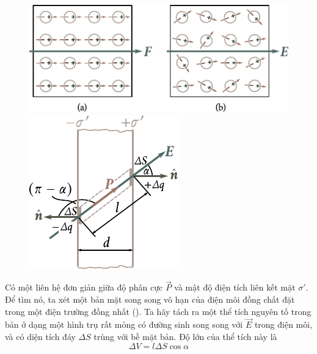 \begin{figure}[!htb]
	\begin{minipage}[t]{0.64\linewidth}
		\begin{center}
			\includegraphics[scale=1]{figures/ch_02/fig_2_1.pdf}
			\caption[]{}
			\label{fig:2_1}
		\end{center}
	\end{minipage}
	\hfill{}%
	\begin{minipage}[t]{0.34\linewidth}
		\begin{center}
			\includegraphics[scale=1]{figures/ch_02/fig_2_2.pdf}
			\caption[]{}
			\label{fig:2_2}
		\end{center}
	\end{minipage}
\vspace{-0.4cm}
\end{figure}

Có một liên hệ đơn giản giữa độ phân cực $\vec{P}$ và mật độ điện tích liên kết mặt $\sigma'$. Để tìm nó, ta  xét một bản mặt song song vô hạn của điện môi đồng chất đặt trong một điện trường đồng nhất (). Ta hãy tách ra một thể tích nguyên tố trong bản ở dạng một hình trụ rất mỏng có đường sinh song song với $\vec{E}$ trong điện môi, và có diện tích đáy $\Delta{S}$ trùng với bề mặt bản. Độ lớn của thể tích này là
\begin{equation*}
    \Delta{V} = l \Delta{S} \cos\alpha
\end{equation*}

